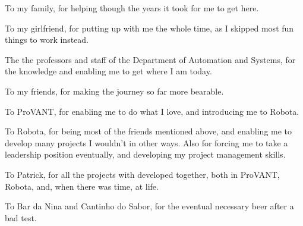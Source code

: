 \begin{agradecimentos}

To my family, for helping though the years it took for me to get here.

To my girlfriend, for putting up with me the whole time, as I skipped most fun things to work instead.

The the professors and staff of the Department of Automation and Systems, for the knowledge and enabling me to get where I am today.

To my friends, for making the journey so far more bearable.

To ProVANT, for enabling me to do what I love, and introducing me to Robota. 

To Robota, for being most of the friends mentioned above, and enabling me to develop many projects I wouldn't in other ways. Also for forcing me to take a leadership position eventually, and developing my project management skills.

To Patrick, for all the projects with developed together, both in ProVANT, Robota, and, when there was time, at life.

To Bar da Nina and Cantinho do Sabor, for the eventual necessary beer after a bad test.



\end{agradecimentos}

